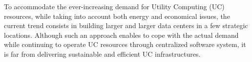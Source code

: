 %
%
%

To accommodate the ever-increasing demand for Utility Computing (UC) resources, while taking
into account both energy and economical issues, the current trend consists in
building larger and larger data centers in a few strategic locations. Although
such an approach enables to cope with the actual demand 
while continuing to operate UC resources through centralized
software system, it is far from delivering sustainable and efficient UC infrastructures. 

